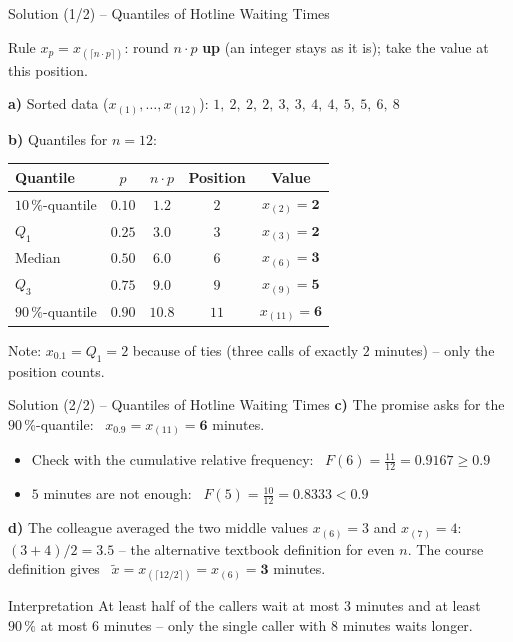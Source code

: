 \documentclass[aspectratio=169,11pt]{beamer}
\begin{document}
\begin{frame}{Solution (1/2) -- Quantiles of Hotline Waiting Times}
  \begin{block}{Rule}
    $x_p = x_{(\lceil n \cdot p \rceil)}$: round $n \cdot p$ \textbf{up} (an integer stays as it is);
    take the value at this position.
  \end{block}
  \textbf{a)} Sorted data ($x_{(1)}, \ldots, x_{(12)}$): \quad
  $1,\ 2,\ 2,\ 2,\ 3,\ 3,\ 4,\ 4,\ 5,\ 5,\ 6,\ 8$

  \medskip
  \textbf{b)} Quantiles for $n = 12$:
  \begin{center}
    \renewcommand{\arraystretch}{1.1}
    \begin{tabular}{lcccc}
      \toprule
      Quantile & $p$ & $n \cdot p$ & Position & Value \\
      \midrule
      $10\,\%$-quantile & $0.10$ & $1.2$ & $2$ & $x_{(2)} = \mathbf{2}$ \\
      $Q_1$ & $0.25$ & $3.0$ & $3$ & $x_{(3)} = \mathbf{2}$ \\
      Median & $0.50$ & $6.0$ & $6$ & $x_{(6)} = \mathbf{3}$ \\
      $Q_3$ & $0.75$ & $9.0$ & $9$ & $x_{(9)} = \mathbf{5}$ \\
      $90\,\%$-quantile & $0.90$ & $10.8$ & $11$ & $x_{(11)} = \mathbf{6}$ \\
      \bottomrule
    \end{tabular}
  \end{center}
  {\small Note: $x_{0.1} = Q_1 = 2$ because of ties (three calls of exactly $2$ minutes) -- only the position counts.}
\end{frame}

\begin{frame}{Solution (2/2) -- Quantiles of Hotline Waiting Times}
  \textbf{c)} The promise asks for the $90\,\%$-quantile: \ $x_{0.9} = x_{(11)} = \mathbf{6}$ minutes.
  \begin{itemize}
    \item Check with the cumulative relative frequency: \ $F(6) = \tfrac{11}{12} = 0.9167 \geq 0.9$ \checkmark
    \item $5$ minutes are not enough: \ $F(5) = \tfrac{10}{12} = 0.8333 < 0.9$
  \end{itemize}

  \medskip
  \textbf{d)} The colleague averaged the two middle values $x_{(6)} = 3$ and $x_{(7)} = 4$:
  $(3 + 4) / 2 = 3.5$ -- the alternative textbook definition for even $n$.
  The course definition gives \ $\tilde{x} = x_{(\lceil 12/2 \rceil)} = x_{(6)} = \mathbf{3}$ minutes.
  \begin{alertblock}{Interpretation}
    At least half of the callers wait at most $3$ minutes and at least $90\,\%$ at most $6$ minutes
    -- only the single caller with $8$ minutes waits longer.
  \end{alertblock}
\end{frame}
\end{document}
